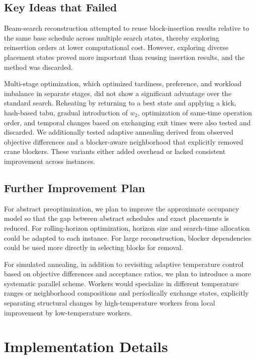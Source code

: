 \documentclass[runningheads]{llncs}
\begin{document}
\subsection{Key Ideas that Failed}

Beam-search reconstruction attempted to reuse block-insertion results relative to the same base schedule across multiple search states, thereby exploring reinsertion orders at lower computational cost. However, exploring diverse placement states proved more important than reusing insertion results, and the method was discarded.

Multi-stage optimization, which optimized tardiness, preference, and workload imbalance in separate stages, did not show a significant advantage over the standard search. Reheating by returning to a best state and applying a kick, hash-based tabu, gradual introduction of $w_2$, optimization of same-time operation order, and temporal changes based on exchanging exit times were also tested and discarded. We additionally tested adaptive annealing derived from observed objective differences and a blocker-aware neighborhood that explicitly removed crane blockers. These variants either added overhead or lacked consistent improvement across instances.

\subsection{Further Improvement Plan}

For abstract preoptimization, we plan to improve the approximate occupancy model so that the gap between abstract schedules and exact placements is reduced. For rolling-horizon optimization, horizon size and search-time allocation could be adapted to each instance. For large reconstruction, blocker dependencies could be used more directly in selecting blocks for removal.

For simulated annealing, in addition to revisiting adaptive temperature control based on objective differences and acceptance ratios, we plan to introduce a more systematic parallel scheme. Workers would specialize in different temperature ranges or neighborhood compositions and periodically exchange states, explicitly separating structural changes by high-temperature workers from local improvement by low-temperature workers.

\section{Implementation Details}
\label{sec:implementation}
\end{document}
